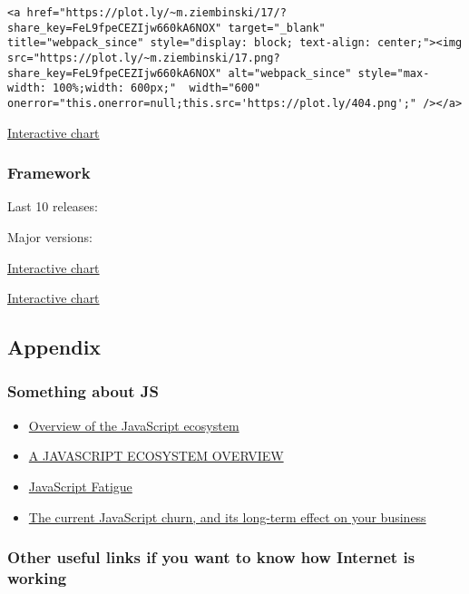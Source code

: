 \begin{verbatim}
<a href="https://plot.ly/~m.ziembinski/17/?share_key=FeL9fpeCEZIjw660kA6NOX" target="_blank" title="webpack_since" style="display: block; text-align: center;"><img src="https://plot.ly/~m.ziembinski/17.png?share_key=FeL9fpeCEZIjw660kA6NOX" alt="webpack_since" style="max-width: 100%;width: 600px;"  width="600" onerror="this.onerror=null;this.src='https://plot.ly/404.png';" /></a>
\end{verbatim}

\href{https://plot.ly/~m.ziembinski/17/}{Interactive chart}

\subsubsection{Framework}\label{framework}

Last 10 releases:

Major versions:

\href{https://plot.ly/~m.ziembinski/5/}{Interactive chart}

\href{https://plot.ly/~m.ziembinski/7/}{Interactive chart}

\subsection{Appendix}\label{appendix}

\subsubsection{Something about JS}\label{something-about-js}

\begin{itemize}
\tightlist
\item
  \href{https://medium.com/@bojzi/overview-of-the-javascript-ecosystem-8ec4a0b7a7be}{Overview
  of the JavaScript ecosystem}
\item
  \href{https://www.imaginarycloud.com/blog/a-javascript-ecosystem-overview/}{A
  JAVASCRIPT ECOSYSTEM OVERVIEW}
\item
  \href{https://medium.com/@ericclemmons/javascript-fatigue-48d4011b6fc4}{JavaScript
  Fatigue}
\item
  \href{http://www.confluentforms.com/2016/01/javascript-churn-technology-investment-effect.html}{The
  current JavaScript churn, and its long-term effect on your business}
\end{itemize}

\subsubsection{Other useful links if you want to know how Internet is
working}\label{other-useful-links-if-you-want-to-know-how-internet-is-working}

